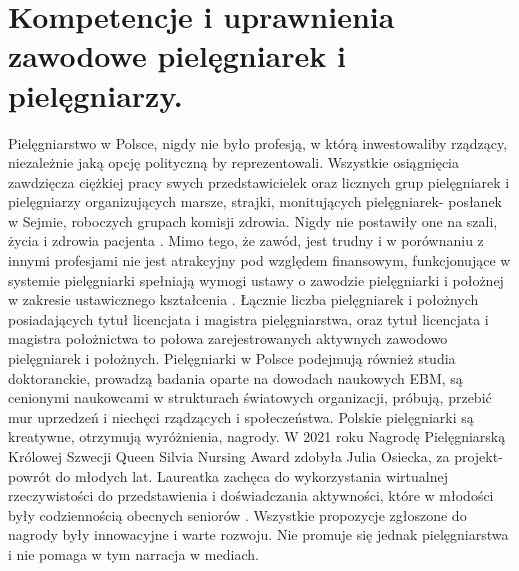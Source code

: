\documentclass[a4paper,12pt,twoside,openany]{report}
\begin{document}
\section{Kompetencje i uprawnienia zawodowe pielęgniarek i pielęgniarzy.}
Pielęgniarstwo w Polsce, nigdy nie było profesją, w którą inwestowaliby rządzący, niezależnie jaką opcję polityczną by reprezentowali. Wszystkie osiągnięcia zawdzięcza ciężkiej pracy swych przedstawicielek oraz licznych grup pielęgniarek i pielęgniarzy organizujących marsze, strajki, monitujących pielęgniarek- posłanek w Sejmie, roboczych grupach komisji zdrowia. Nigdy nie postawiły one na szali, życia i zdrowia pacjenta \cite{strajk}. Mimo tego, że zawód, jest trudny i w porównaniu z innymi profesjami nie jest atrakcyjny pod względem finansowym, funkcjonujące w systemie pielęgniarki spełniają wymogi ustawy o zawodzie pielęgniarki i położnej  w zakresie ustawicznego kształcenia \cite{2011}. Łącznie liczba pielęgniarek i położnych posiadających tytuł licencjata i magistra pielęgniarstwa, oraz tytuł licencjata i magistra położnictwa to połowa zarejestrowanych aktywnych zawodowo pielęgniarek i położnych\cite{ile}. Pielęgniarki w Polsce podejmują również studia doktoranckie, prowadzą badania oparte na dowodach naukowych EBM, są cenionymi naukowcami w strukturach światowych organizacji, próbują, przebić mur uprzedzeń i niechęci rządzących i społeczeństwa. Polskie pielęgniarki są kreatywne, otrzymują wyróżnienia, nagrody. W 2021 roku Nagrodę Pielęgniarską Królowej Szwecji Queen Silvia Nursing Award zdobyła Julia Osiecka, za projekt- powrót do młodych lat. Laureatka zachęca do wykorzystania wirtualnej rzeczywistości do przedstawienia i doświadczania aktywności, które w młodości były codziennością obecnych seniorów \cite{julia}. Wszystkie propozycje zgłoszone do nagrody były innowacyjne i warte rozwoju. Nie promuje się jednak  pielęgniarstwa i nie pomaga w tym narracja w mediach.
\end{document}
